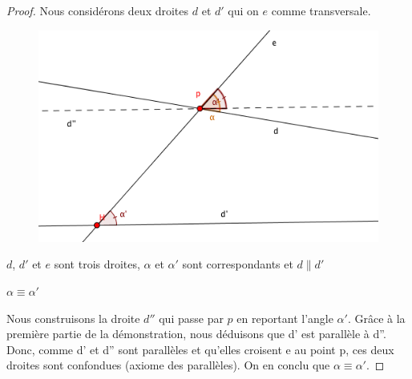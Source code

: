 \documentclass[a4paper,12pt]{article}
\begin{document}
\begin{proof}
Nous considérons deux droites $d$ et $d'$ qui on $e$ comme transversale.

 \begin{figure}[H]
    \centering
    \includegraphics[scale=0.6]{schema/Transversale_4.png}
\end{figure}


\begin{hyp}
     $d$, $d'$ et $e$ sont trois droites,
     $\alpha$ et $\alpha'$ sont correspondants et
     $d \parallel d'$
 \end{hyp}
 \begin{concl}
     $\alpha \equiv \alpha'$
 \end{concl}
 Nous construisons la droite $d''$ qui passe par $p$ en reportant l'angle $\alpha'$. Grâce à la première partie de la démonstration, nous déduisons que d' est parallèle à d''. Donc, comme d' et d'' sont parallèles et qu'elles croisent e au point p, ces deux droites sont confondues (axiome des parallèles). On en conclu que $\alpha \equiv \alpha'$.
\end{proof}
\end{document}
